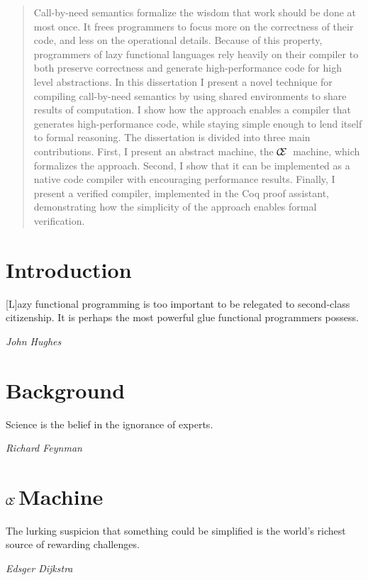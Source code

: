\documentclass[botnum,letterpaper]{unmeethesis}
\def\ce{$\mathcal{\mathcal{C} \mskip -4mu \mathcal{E}} \mskip 4mu$}
\begin{document}
\begin{abstract}
Call-by-need semantics formalize the wisdom that work should be done at most
once. It frees programmers to focus more on the correctness of their code, and
less on the operational details. Because of this property, programmers of lazy
functional languages rely heavily on their compiler to both preserve correctness
and generate high-performance code for high level abstractions. In this
dissertation I present a novel technique for compiling call-by-need semantics by
using shared environments to share results of computation. I show how the
approach enables a compiler that generates high-performance code, while staying
simple enough to lend itself to formal reasoning. The dissertation is divided
into three main contributions.  First, I present an abstract machine, the \ce
machine, which formalizes the approach.  Second, I show that it can be
implemented as a native code compiler with encouraging performance results.
Finally, I present a verified compiler, implemented in the Coq proof assistant,
demonstrating how the simplicity of the approach enables formal verification.  
\clearpage %
\end{abstract}

\tableofcontents
\listoffigures

\mainmatter

\chapter{Introduction}\label{chap:intro}
\epigraph{
[L]azy functional programming is too important to be relegated to second-class
citizenship. It is perhaps the most powerful glue functional programmers
possess.}{\textit{John Hughes}}


\chapter{Background}\label{chap:background}
\epigraph{Science is the belief in the ignorance of experts.}{\textit{Richard
Feynman}}


\chapter{\ce Machine}\label{chap:ce}
\epigraph{The lurking suspicion that something could be simplified is the
world's richest source of rewarding challenges.}{\textit{Edsger Dijkstra}}



\end{document}
